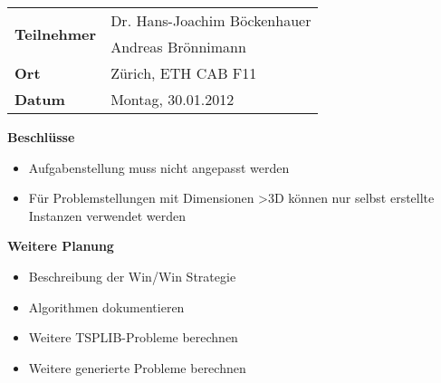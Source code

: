 \documentclass[a4paper]{article}
\begin{document}
\begin{longtable}{p{7cm} p{7cm}}
 \hline
 \multirow{2}{*}{\textbf{Teilnehmer}}  & Dr. Hans-Joachim Böckenhauer\\
         								& Andreas Brönnimann\\
 \hline
	\textbf{Ort} & Zürich, ETH CAB F11\\
 \hline
	\textbf{Datum} & Montag, 30.01.2012\\
\hline
\end{longtable}

\textbf{Beschlüsse}
\begin{itemize}
	\item Aufgabenstellung muss nicht angepasst werden
        \item Für Problemstellungen mit Dimensionen \textgreater 3D können nur selbst erstellte Instanzen verwendet werden
\end{itemize}

\textbf{Weitere Planung}
\begin{itemize}
	\item Beschreibung der Win/Win Strategie
        \item Algorithmen dokumentieren
        \item Weitere TSPLIB-Probleme berechnen
        \item Weitere generierte Probleme berechnen
\end{itemize}
\end{document}

